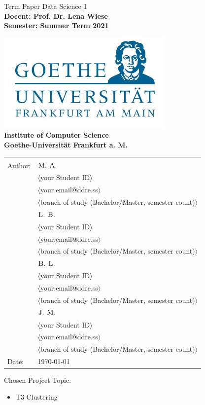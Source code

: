 \begin{center}

{\Huge {
Term Paper Data Science 1}
}
\\[2ex]

\textbf{
\Large 
Docent: Prof. Dr. Lena Wiese \\ 
Semester: Summer Term 2021\\  
}



\includegraphics[scale=0.4]{images/logo.jpg} \\ 
\large{\textbf{Institute of Computer Science \\ Goethe-Universit\"at Frankfurt a. M.}}



\begin{tabular}{ll}
& \\
Author: & $\textsc{M. A.}$ \\
& $\langle$your Student ID$\rangle$\\
& $\langle$your.email@ddre.ss$\rangle$ \\
& $\langle$branch of study (Bachelor/Master, semester count)$\rangle$ \\
& $\textsc{L. B.}$ \\
& $\langle$your Student ID$\rangle$\\
& $\langle$your.email@ddre.ss$\rangle$ \\
& $\langle$branch of study (Bachelor/Master, semester count)$\rangle$ \\
& $\textsc{B. L.}$ \\
& $\langle$your Student ID$\rangle$\\
& $\langle$your.email@ddre.ss$\rangle$ \\
& $\langle$branch of study (Bachelor/Master, semester count)$\rangle$ \\
& $\textsc{J. M.}$ \\
& $\langle$your Student ID$\rangle$\\
& $\langle$your.email@ddre.ss$\rangle$ \\
& $\langle$branch of study (Bachelor/Master, semester count)$\rangle$ \\
Date: & \today \\		
\end{tabular}

\end{center}

\vspace*{\fill}

\large
\noindent{}Chosen Project Topic: %
\begin{itemize}
\item T3 Clustering
\end{itemize}